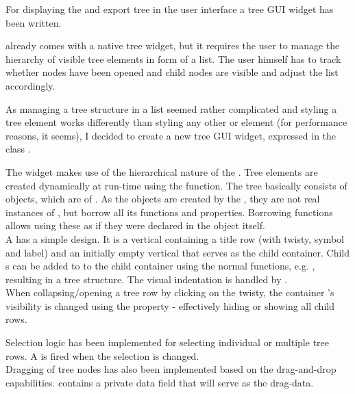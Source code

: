 For displaying the  and export tree in the user interface a tree GUI widget has been written.

 already comes with a native tree widget, but it requires the user to manage the hierarchy of visible tree elements in form of a list. The user himself has to track whether nodes have been opened and child nodes are visible and adjust the list accordingly.

As managing a tree structure in a list seemed rather complicated and styling a  tree element works differently than styling any other  or  element (for performance reasons, it seems), I decided to create a new tree GUI widget, expressed in the class .

The widget makes use of the hierarchical nature of the  . Tree elements are created dynamically at run-time using the \linebreak{} function. The tree basically consists of   objects, which are  of . As the  objects are created by the , they are not real instances of , but borrow all its functions and properties. Borrowing functions allows using these as if they were declared in the object itself.\\
A  has a simple design. It is a vertical  containing a title row (with twisty, symbol and label) and an initially empty vertical  that serves as the child container. Child s can be added to to the child container using the normal  functions, e.g. , resulting in a tree structure. The visual indentation is handled by .\\
When collapsing/opening a tree row by clicking on the twisty, the container 's visibility is changed using the   property - effectively hiding or showing all child rows.

Selection logic has been implemented for selecting individual or multiple tree rows. A   is fired when the selection is changed.\\
Dragging of tree nodes has also been implemented based on the  drag-and-drop capabilities.  contains a private data field that will serve as the drag-data.

